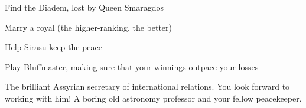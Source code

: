 \documentclass[char]{Kos}
\begin{document}
\begin{itemz}[Goals]
\item Find the Diadem, lost by Queen Smaragdos
\item Marry a royal (the higher-ranking, the better)
\item Help Sirasu keep the peace
\item Play Bluffmaster, making sure that your winnings outpace your losses
\end{itemz}

\begin{contacts}
 The brilliant Assyrian secretary of international relations. You look forward to working with him!
\contact{\cAnarchist{}} A boring old astronomy professor and your fellow peacekeeper.
\end{contacts}
\end{document}
